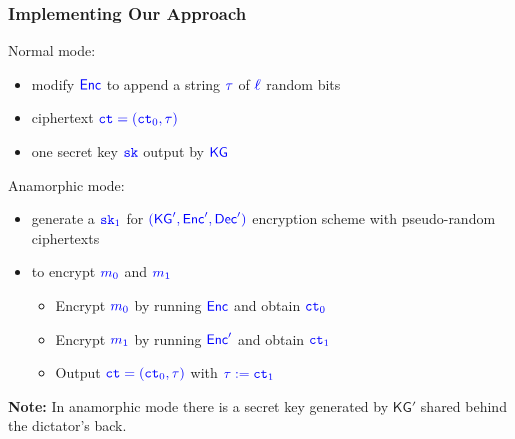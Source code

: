 \documentclass[]{beamer}
\newcommand{\algofont}[1]{{\mathsf{#1}}}
\newcommand{\objfont}[1]{{\mathtt{#1}}}
\newcommand{\kg}{\algofont{KG}}
\newcommand{\enc}{\algofont{Enc}}
\newcommand{\dec}{\algofont{Dec}}
\newcommand{\ct}{\objfont{ct}}      %
\newcommand{\sk}{\objfont{sk}}      %
\begin{document}
\begin{frame}
\frametitle{Implementing Our Approach}
\begin{exampleblock}{}
\color{purple}Normal mode:
\begin{itemize}
    \item modify $\color{blue}\enc$ to append 
            a string $\color{blue}\tau$ of $\color{blue}\ell$ random bits
    \item ciphertext $\color{blue}\ct=(\ct_0,\tau)$
    \item one secret key $\color{blue}\sk$ output by $\color{blue}\kg$
\end{itemize}
\pause
\color{purple}Anamorphic mode:
\begin{itemize}
    \item generate a $\color{blue}\sk_1$ for $\color{blue}(\kg',\enc',\dec')$ encryption scheme
        with {\color{magenta}pseudo-random} ciphertexts 
    \item to encrypt $\color{blue} m_0$ and $\color{blue} m_1$
        \begin{itemize}
            \item Encrypt $\color{blue} m_0$ by running $\color{blue} \enc$ and obtain $\color{blue} \ct_0$
            \item Encrypt $\color{blue} m_1$ by running $\color{blue} \enc'$ and obtain $\color{blue} \ct_1$
            \item Output $\color{blue}\ct=(\ct_0,\tau)$ with $\color{blue} \tau:=\ct_1$
        \end{itemize}
\end{itemize}
\end{exampleblock}
{\color{red}\bf Note:} 
In anamorphic mode there is a secret key generated by $\kg'$ shared behind the dictator's back.

\end{frame}
\end{document}
